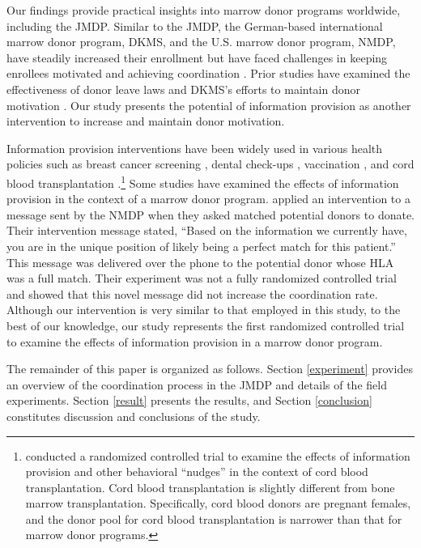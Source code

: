 \documentclass[12pt, a4paper]{article}
\begin{document}
Our findings provide practical insights into marrow donor programs worldwide, including the JMDP. Similar to the JMDP, the German-based international marrow donor program, DKMS, and the U.S. marrow donor program, NMDP, have steadily increased their enrollment but have faced challenges in keeping enrollees motivated and achieving coordination \citep{Switzer1999, Switzer2004, Haylock2024}. Prior studies have examined the effectiveness of donor leave laws \citep{Lacetera2014} and DKMS's efforts to maintain donor motivation \citep{Haylock2024}. Our study presents the potential of information provision as another intervention to increase and maintain donor motivation.

Information provision interventions have been widely used in various health policies such as breast cancer screening \citep{Bertoni2020}, dental check-ups \citep{Altmann2014}, vaccination \citep[e.g.,][]{Dai2021, Milkman2021}, and cord blood transplantation \citep{Grieco2018}.\footnote{\citet{Grieco2018} conducted a randomized controlled trial to examine the effects of information provision and other behavioral ``nudges'' in the context of cord blood transplantation. Cord blood transplantation is slightly different from bone marrow transplantation. Specifically, cord blood donors are pregnant females, and the donor pool for cord blood transplantation is narrower than that for marrow donor programs.} Some studies have examined the effects of information provision in the context of a marrow donor program. \citet{Switzer2018} applied an intervention to a message sent by the NMDP when they asked matched potential donors to donate. Their intervention message stated, ``Based on the information we currently have, you are in the unique position of likely being a perfect match for this patient.'' This message was delivered over the phone to the potential donor whose HLA was a full match. Their experiment was not a fully randomized controlled trial and showed that this novel message did not increase the coordination rate. Although our intervention is very similar to that employed in this study, to the best of our knowledge, our study represents the first randomized controlled trial to examine the effects of information provision in a marrow donor program.

The remainder of this paper is organized as follows. Section \ref{experiment} provides an overview of the coordination process in the JMDP and details of the field experiments. Section \ref{result} presents the results, and Section \ref{conclusion} constitutes discussion and conclusions of the study.
\end{document}
